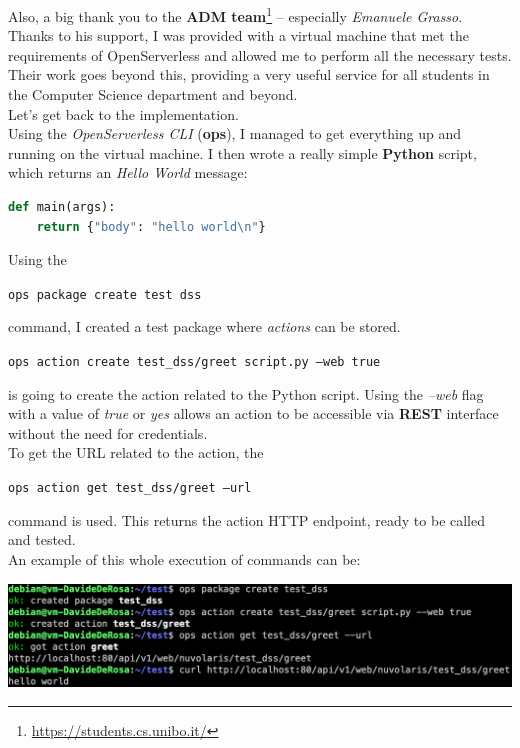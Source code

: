 Also, a big thank you to the \textbf{ADM team}\footnote{\url{https://students.cs.unibo.it/}} -- especially \textit{Emanuele Grasso}. Thanks to his support, I was provided with a virtual machine that met the requirements of OpenServerless and allowed me to perform all the necessary tests. Their work goes beyond this, providing a very useful service for all students in the Computer Science department and beyond.\vspace{14pt}\\
Let's get back to the implementation.\vspace{14pt}\\
Using the \textit{OpenServerless CLI} (\textbf{ops}), I managed to get everything up and running on the virtual machine. I then wrote a really simple \textbf{Python} script, which returns an \textit{Hello World} message:
\begin{lstlisting}[language=python]
def main(args):
    return {"body": "hello world\n"}
\end{lstlisting}
\vspace{15pt}
Using the \vspace{-5pt}
\begin{center}
    \colorbox{codegray}{\texttt{ops package create test dss}}
\end{center} 
command, I created a test package where \textit{actions} can be stored.\\
\begin{center}
    \colorbox{codegray}{\texttt{ops action create test\_dss/greet script.py --web true}}
\end{center} 
is going to create the action related to the Python script. Using the \textit{--web} flag with a value of \textit{true} or \textit{yes} allows an action to be accessible via \textbf{REST} interface without the need for credentials.\vspace{14pt}\\
To get the URL related to the action, the
\begin{center}
    \colorbox{codegray}{\texttt{ops action get test\_dss/greet --url}}
\end{center} 
command is used. This returns the action HTTP endpoint, ready to be called and tested.\vspace{150pt}\\
An example of this whole execution of commands can be:
\begin{center}
    \includegraphics[width=1\textwidth]{img/demo.png}
\end{center}
